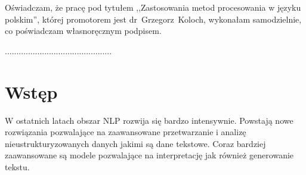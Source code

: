 \documentclass[a4paper,11pt,twoside]{report}
\theoremstyle{definition}
\newcommand{\tytul}{Zastosowania metod procesowania w języku polskim}
\newcommand{\supervisor}{dr~Grzegorz~Koloch}
\begin{document}
\indent Oświadczam, że pracę pod
tytułem ,,\tytul '', której promotorem jest \mbox{\supervisor}, wykonałam
samodzielnie, co poświadczam własnoręcznym podpisem.
\vspace{2cm}


\begin{flushright}
  \begin{minipage}{50mm}
    \begin{center}
      ..............................................

    \end{center}
  \end{minipage}
\end{flushright}

\thispagestyle{empty}
\newpage

\null\thispagestyle{empty}\newpage


\tableofcontents
\thispagestyle{empty}

\newpage %

\null\thispagestyle{empty}\newpage
\pagestyle{fancy}
\setcounter{page}{11} 

\chapter{Wstęp}

W ostatnich latach obszar NLP rozwija się bardzo intensywnie. Powstają nowe rozwiązania pozwalające na zaawansowane przetwarzanie i analizę nieustrukturyzowanych danych jakimi są dane tekstowe. Coraz bardziej zaawansowane są modele pozwalające na interpretację jak również generowanie tekstu. \\
\end{document}
